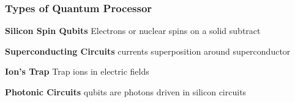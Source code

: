 \documentclass[xcolor=x11names,table]{beamer}
\begin{document}
\begin{frame}
\frametitle{Types of Quantum Processor}
	\begin{block}{\textbf{Silicon Spin Qubits}}
		Electrons or nuclear spins on a solid subtract
	\end{block}
	\begin{block}{\textbf{Superconducting Circuits}}
		currents superposition around superconductor
	\end{block}
	\begin{block}{\textbf{Ion's Trap}}
		Trap ions in electric fields
	\end{block}
	\begin{block}{\textbf{Photonic Circuits}}
		qubits are photons driven in silicon circuits
	\end{block}
\end{frame}
\end{document}
